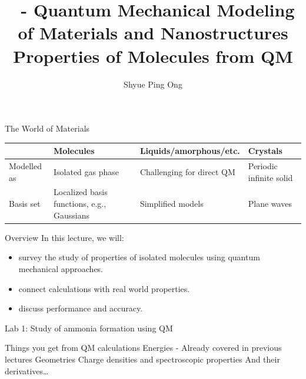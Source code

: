 \documentclass[aspectratio=169]{beamer}
\title[\classname Properties of Molecules from QM]{\classname~- Quantum Mechanical Modeling of Materials and Nanostructures\\Properties of Molecules from QM}
\author{Shyue Ping Ong}
\institute[UCSD]{University of California, San Diego\\
\medskip
}
\date{\classyear} %
\begin{document}
    \begin{frame}
        \titlepage %
    \end{frame}


    \begin{frame}{The World of Materials}

        \begin{table}[]
            \centering
            \begin{tabular}{p{2cm}|p{3cm}|p{4cm}|p{3cm}}
                & Molecules                                  & Liquids/amorphous/etc.    & Crystals                \\
                \hline
                \hline
                Modelled as & Isolated gas phase                         & Challenging for direct QM & Periodic infinite solid \\
                Basis set   & Localized basis functions, e.g., Gaussians & Simplified models         & Plane waves
            \end{tabular}
        \end{table}
    \end{frame}

    \begin{frame}{Overview}
        In this lecture, we will:
        \begin{itemize}
            \item survey the study of properties of isolated molecules using quantum mechanical approaches.
            \item connect calculations with real world properties.
            \item discuss performance and accuracy.
        \end{itemize}

        Lab 1: Study of ammonia formation using QM

    \end{frame}


    \begin{frame}{Things you get from QM calculations}
        Energies - Already covered in previous lectures\newline
        \newline
        Geometries\newline
        \newline
        Charge densities and spectroscopic properties\newline
        \newline
        And their derivatives…
    \end{frame}
\end{document}
